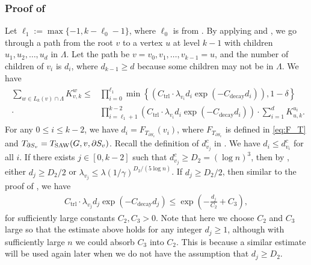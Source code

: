 \documentclass[11pt]{amsart}
\newcommand{\tp}[1]{{\left( #1 \right)}}
\newcommand{\defeq}{:=}
\theoremstyle{definition}
\theoremstyle{remark}
\begin{document}
\subsubsection{Proof of }
Let $\ell_1\defeq\max\{-1,k-\ell_0-1\}$,
where $\ell_0$ is from . 
By applying  and , we go through a path from the root $v$ to a vertex $u$ at level $k-1$ with children $u_1,u_2,\ldots,u_d$ in $\Lambda$. Let 
the path be $v = v_0,v_1,\ldots,v_{k-1} = u$, and the number of children of $v_i$ is $d_i$, where $d_{k-1}\geq d$ because some children may not be in $\Lambda$. We have
\begin{align}\label{eq:influence-bound-level-2-pf}
    \begin{split}
    \sum_{w\in L_k(v) \cap \Lambda }K_{v,k}^{w}\leq &\prod_{i=0}^{\ell_1}\min\left \{\tp{C_{\text{trl}} \cdot \lambda_{v_i} d_i \exp(-C_{\text{decay}}d_i)},1-\delta\right \}\\
    \cdot&\prod_{i=\ell_1+1}^{k-2}\tp{C_{\text{trl}} \cdot \lambda_{v_i} d_i \exp(-C_{\text{decay}}d_i)} \cdot \sum_{i=1}^d K_{u,k}^{u_i}.
    \end{split}
\end{align} 
For any $0 \leq i \leq k-2$, we have $d_i=F_{T_{\partial S_v}}(v_i)$, where $F_{T_{\partial S_v}}$ is defined in \eqref{eq:F_T} and $T_{\partial S_v} = T_{\textnormal{SAW}}(G,v,\partial S_v)$. 
Recall the definition of $d_{v_j}^c$ in . We have $d_i \leq d_{v_i}^c$ for all $i$. 
If there exists $j\in [0,k-2]$ such that $d_{v_j}^c \geq D_2 = (\log n)^3$, then by , either $d_j \geq D_2/2$ or $\lambda_{v_j} \leq \lambda (1/\gamma)^{D_2/(5 \log n)}$. If $d_j \geq D_2/2$, then
similar to the proof of , we have
\begin{align*}
    C_{\text{trl}} \cdot \lambda_{v_j} d_j \exp(-C_{\text{decay}}d_j)\leq \exp \left(-\frac{d_j}{C_2}+C_3\right),
\end{align*}
for sufficiently large constants $C_2,C_3>0$. 
Note that here we choose $C_2$ and $C_3$ large so that the estimate above holds for any integer $d_j\ge 1$,
although with sufficiently large $n$ we could absorb $C_3$ into $C_2$.
This is because a similar estimate will be used again later when we do not have the assumption that $d_j\ge D_2$.
\end{document}

